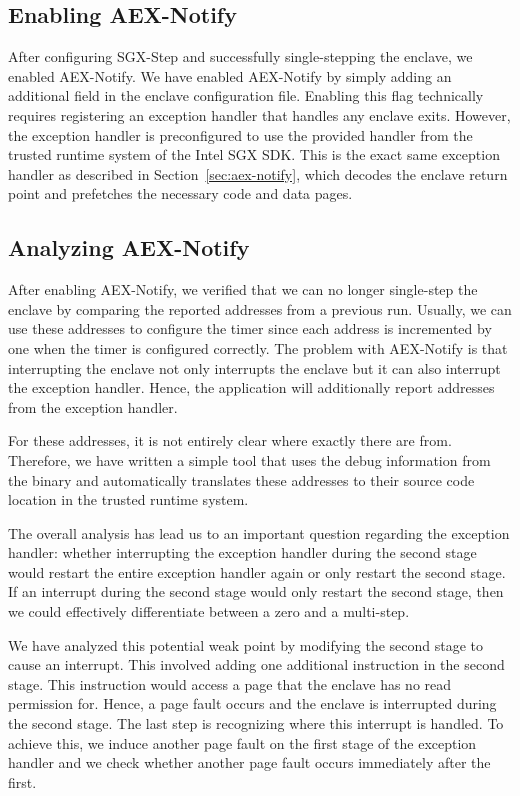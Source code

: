 \documentclass{llncs}
\begin{document}
\subsection{Enabling AEX-Notify}

After configuring SGX-Step and successfully single-stepping the enclave,
we enabled AEX-Notify.
We have enabled AEX-Notify by simply adding an additional field in the enclave configuration file.
Enabling this flag technically requires registering an exception handler that handles any enclave exits.
However, the exception handler is preconfigured to use the provided handler
from the trusted runtime system of the Intel SGX SDK.
This is the exact same exception handler as described in Section~\ref{sec:aex-notify},
which decodes the enclave return point and prefetches the necessary code and data pages.

\subsection{Analyzing AEX-Notify}

After enabling AEX-Notify, we verified that we can no longer single-step the enclave
by comparing the reported addresses from a previous run.
Usually, we can use these addresses to configure the timer
since each address is incremented by one when the timer is configured correctly.
The problem with AEX-Notify is that interrupting the enclave not only
interrupts the enclave but it can also interrupt the exception handler.
Hence, the application will additionally report addresses from the exception handler.

For these addresses, it is not entirely clear where exactly there are from.
Therefore, we have written a simple tool that uses the debug information from the binary and
automatically translates these addresses to their source code location in the trusted runtime system.


The overall analysis has lead us to an important question regarding the exception handler:
whether interrupting the exception handler during the second stage would
restart the entire exception handler again or only restart the second stage.
If an interrupt during the second stage would only restart the second stage,
then we could effectively differentiate between a zero and a multi-step.

We have analyzed this potential weak point by modifying the second stage to cause an interrupt.
This involved adding one additional instruction in the second stage.
This instruction would access a page that the enclave has no read permission for.
Hence, a page fault occurs and the enclave is interrupted during the second stage.
The last step is recognizing where this interrupt is handled.
To achieve this, we induce another page fault on the first stage of the exception handler
and we check whether another page fault occurs immediately after the first.
\end{document}
